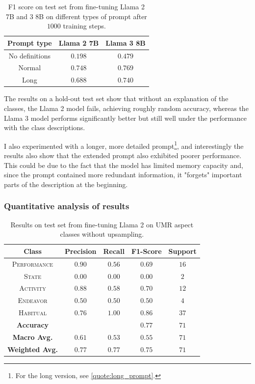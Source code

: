 \begin{table}
    \centering
    \begin{tabular}{|c|c|c|}\hline
        \textbf{Prompt type} & \textbf{Llama 2 7B} & \textbf{Llama 3 8B} \\ \hline
        No definitions & $0.198$ & $0.479$ \\ \hline
        Normal  & $0.748$ & $0.769$ \\\hline
        Long & $0.688$ & $0.740$  \\ \hline
    \end{tabular}
    \caption{F1 score on test set from fine-tuning Llama 2 7B and 3 8B on different types of prompt after $1000$ training steps.}
    \label{table:long_normal_description}
\end{table}

The results on a hold-out test set show that without an explanation of the classes, the Llama 2 model fails, achieving roughly random accuracy, whereas the Llama 3 model performs significantly better but still well under the performance with the class descriptions.

I also experimented with a longer, more detailed prompt\footnote{For the long version, see \ref{quote:long_prompt}.}, and interestingly the results also show that the extended prompt also exhibited poorer performance. This could be due to the fact that the model has limited memory capacity and, since the prompt contained more redundant information, it "forgets" important parts of the description at the beginning. 

\subsubsection*{Quantitative analysis of results}

\begin{table}
    \centering
    \begin{tabular}{|c|c|c|c|c|}\hline
        \textbf{Class} & \textbf{Precision} & \textbf{Recall} & \textbf{F1-Score} & \textbf{Support} \\ \hline
        \textsc{Performance} & $0.90$ & $0.56$ & $0.69$ & $16$\\ \hline
        \textsc{State} & $0.00$ & $0.00$ & $0.00$ & $2$\\\hline
        \textsc{Activity} & $0.88$ & $0.58$ & $0.70$ & $12$\\\hline
        \textsc{Endeavor} & $0.50$ & $0.50$ & $0.50$ & $4$\\\hline
        \textsc{Habitual} & $0.76$ & $1.00$ & $0.86$ & $37$\\ \hline \hline
        \textbf{Accuracy} &  &  & $0.77$ & $71$ \\ \hline
        \textbf{Macro Avg.} & $0.61$  & $0.53$ & $0.55$ & $71$ \\ \hline
        \textbf{Weighted Avg.} & $0.77$  & $0.77$ & $0.75$ & $71$ \\ \hline
    \end{tabular}
    \caption{Results on test set from fine-tuning Llama 2 on UMR aspect classes without upsampling.}
    \label{llama_results_no_upsampling}
\end{table}


